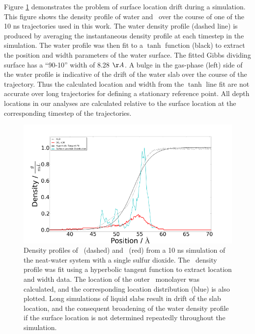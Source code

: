 Figure \ref{fig:density-flaw} demonstrates the problem of surface location drift during a simulation. This figure shows the density profile of water and \suldiox~over the course of one of the 10 ns trajectories used in this work. The water density profile (dashed line) is produced by averaging the instantaneous density profile at each timestep in the simulation. The water profile was then fit to a $\tanh$ function (black) to extract the position and width parameters of the water surface. The fitted Gibbs dividing surface has a ``90-10'' width of 8.28 $\AA$. A bulge in the gas-phase (left) side of the water profile is indicative of the drift of the water slab over the course of the trajectory. Thus the calculated location and width from the $\tanh$ line fit are not accurate over long trajectories for defining a stationary reference point. All depth locations in our analyses are calculated relative to the surface location at the corresponding timestep of the trajectories.

\begin{figure}[h!]
	\begin{center}
		\includegraphics[scale=1.0]{images/density/Density+SurfaceLocation-flawed.png}
		\caption{Density profiles of \wat~(dashed) and \suldiox~(red) from a 10 ns simulation of the neat-water system with a single sulfur dioxide. The \wat~density profile was fit using a hyperbolic tangent function to extract location and width data. The location of the outer \wat~monolayer was calculated, and the corresponding location distribution (blue) is also plotted. Long simulations of liquid slabs result in drift of the slab location, and the consequent broadening of the water density profile if the surface location is not determined repeatedly throughout the simulation.}
		\label{fig:density-flaw}
	\end{center}
\end{figure}

